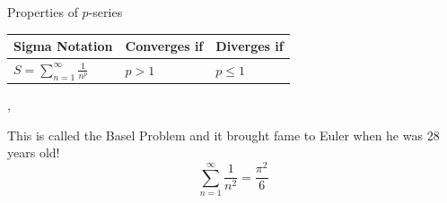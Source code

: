 	\begin{namedframe}{Properties of $p$-series}
		\begin{center}
			\begin{tabular}{l|l|l}
				Sigma Notation                                      & Converges if & Diverges if \\\hline
				$S = \displaystyle\sum_{n=1}^{\infty}\frac{1}{n^p}$ & $p>1$        & $p \leq 1$
			\end{tabular}
		\end{center}

		\sep

		This is called the Basel Problem and it brought fame to Euler when he was 28 years old!
		\[\sum_{n=1}^{\infty}\frac{1}{n^2} = \frac{\pi^2}{6}\]
	\end{namedframe}

